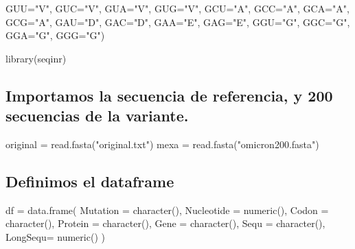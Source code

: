 \documentclass[
]{article}
\newenvironment{Shaded}{\begin{snugshade}}{\end{snugshade}}
\newcommand{\AttributeTok}[1]{\textcolor[rgb]{0.77,0.63,0.00}{#1}}
\newcommand{\FunctionTok}[1]{\textcolor[rgb]{0.00,0.00,0.00}{#1}}
\newcommand{\NormalTok}[1]{#1}
\newcommand{\OtherTok}[1]{\textcolor[rgb]{0.56,0.35,0.01}{#1}}
\newcommand{\StringTok}[1]{\textcolor[rgb]{0.31,0.60,0.02}{#1}}
\begin{document}
\begin{Shaded}
\begin{Highlighting}[]
            \AttributeTok{GUU=}\StringTok{"V"}\NormalTok{, }\AttributeTok{GUC=}\StringTok{"V"}\NormalTok{, }\AttributeTok{GUA=}\StringTok{"V"}\NormalTok{, }\AttributeTok{GUG=}\StringTok{"V"}\NormalTok{,}
            \AttributeTok{GCU=}\StringTok{"A"}\NormalTok{, }\AttributeTok{GCC=}\StringTok{"A"}\NormalTok{, }\AttributeTok{GCA=}\StringTok{"A"}\NormalTok{, }\AttributeTok{GCG=}\StringTok{"A"}\NormalTok{,}
            \AttributeTok{GAU=}\StringTok{"D"}\NormalTok{, }\AttributeTok{GAC=}\StringTok{"D"}\NormalTok{, }\AttributeTok{GAA=}\StringTok{"E"}\NormalTok{, }\AttributeTok{GAG=}\StringTok{"E"}\NormalTok{,}
            \AttributeTok{GGU=}\StringTok{"G"}\NormalTok{, }\AttributeTok{GGC=}\StringTok{"G"}\NormalTok{, }\AttributeTok{GGA=}\StringTok{"G"}\NormalTok{, }\AttributeTok{GGG=}\StringTok{"G"}\NormalTok{)}

\FunctionTok{library}\NormalTok{(seqinr)}
\end{Highlighting}
\end{Shaded}

\hypertarget{importamos-la-secuencia-de-referencia-y-200-secuencias-de-la-variante.-1}{%
\subsection{Importamos la secuencia de referencia, y 200 secuencias de
la
variante.}\label{importamos-la-secuencia-de-referencia-y-200-secuencias-de-la-variante.-1}}

\begin{Shaded}
\begin{Highlighting}[]
\NormalTok{original }\OtherTok{=} \FunctionTok{read.fasta}\NormalTok{(}\StringTok{"original.txt"}\NormalTok{)}
\NormalTok{mexa }\OtherTok{=} \FunctionTok{read.fasta}\NormalTok{(}\StringTok{"omicron200.fasta"}\NormalTok{)}
\end{Highlighting}
\end{Shaded}

\hypertarget{definimos-el-dataframe-1}{%
\subsection{Definimos el dataframe}\label{definimos-el-dataframe-1}}

\begin{Shaded}
\begin{Highlighting}[]
\NormalTok{df }\OtherTok{=} \FunctionTok{data.frame}\NormalTok{(}
  \AttributeTok{Mutation =} \FunctionTok{character}\NormalTok{(),}
  \AttributeTok{Nucleotide =} \FunctionTok{numeric}\NormalTok{(),}
  \AttributeTok{Codon =} \FunctionTok{character}\NormalTok{(),}
  \AttributeTok{Protein =} \FunctionTok{character}\NormalTok{(),}
  \AttributeTok{Gene =} \FunctionTok{character}\NormalTok{(),}
  \AttributeTok{Sequ =} \FunctionTok{character}\NormalTok{(),}
  \AttributeTok{LongSequ=} \FunctionTok{numeric}\NormalTok{()}
\NormalTok{)}
\end{Highlighting}
\end{Shaded}
\end{document}
